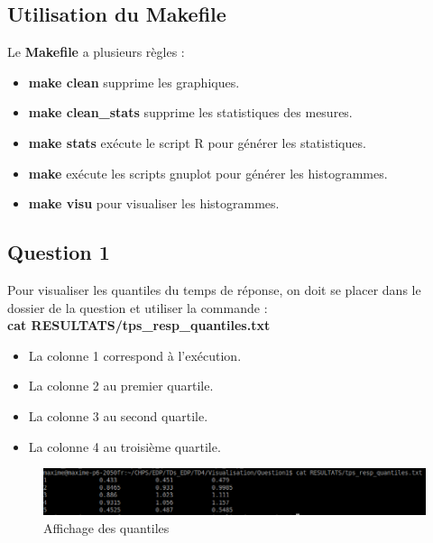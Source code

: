\documentclass[a4paper]{article}
\begin{document}
\FloatBarrier

\subsection*{Utilisation du Makefile}
Le \textbf{Makefile} a plusieurs règles : 
\begin{itemize}
\item \textbf{make clean} supprime les graphiques.
\item \textbf{make clean\_stats} supprime les statistiques des mesures.
\item \textbf{make stats} exécute le script R pour générer les statistiques.
\item \textbf{make} exécute les scripts gnuplot pour générer les histogrammes.
\item \textbf{make visu} pour visualiser les histogrammes.
\end{itemize}

% 		



\subsection{Question 1}

Pour visualiser les quantiles du temps de réponse, on doit se placer dans le dossier de la question et utiliser la commande : \\
\textbf{cat RESULTATS/tps\_resp\_quantiles.txt}

\begin{itemize}
\item La colonne 1 correspond à l'exécution.
\item La colonne 2 au premier quartile.
\item La colonne 3 au second quartile.
\item La colonne 4 au troisième quartile.
\end{itemize}

\begin{figure}[h]
	\begin{center}
		\includegraphics[scale=0.55]{SCREEN/quantiles.png}
	\end{center}
   	\caption{Affichage des quantiles}
	\label{fig:quantiles}
\end{figure}
\end{document}
